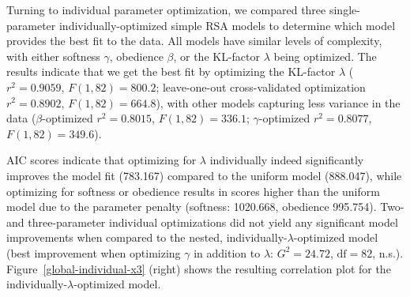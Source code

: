 \documentclass[11pt,a4paper]{article}
\begin{document}




Turning to individual parameter optimization, we compared three single-parameter individually-optimized simple RSA models to determine which model provides the best fit to the data. 
All models have similar levels of complexity, with either softness $\gamma$, obedience $\beta$, or the KL-factor $\lambda$ being optimized.
The results indicate that we get the best fit by optimizing the KL-factor $\lambda$ ($r^{2}=0.9059$, $F(1,82) = 800.2$; leave-one-out cross-validated optimization $r^{2}=0.8902$, $F(1,82) = 664.8$), with other models capturing less variance in the data ($\beta$-optimized $r^{2}=0.8015$, $F(1,82) = 336.1$; $\gamma$-optimized $r^{2}=0.8077$, $F(1,82) = 349.6$).

AIC scores indicate that optimizing for $\lambda$ individually indeed significantly improves the model fit (783.167) compared to the uniform model (888.047), while optimizing for softness or obedience results in scores higher than the uniform model due to the parameter penalty (softness: 1020.668, obedience 995.754).
Two- and three-parameter individual optimizations did not yield any significant model improvements when compared to the nested, individually-$\lambda$-optimized model (best improvement when optimizing $\gamma$ in addition to $\lambda$: $G^2=24.72$, $\textrm{df}=82$, n.s.).
Figure~\ref{global-individual-x3} (right) shows the resulting correlation plot for the individually-$\lambda$-optimized model. 
 
\end{document}
